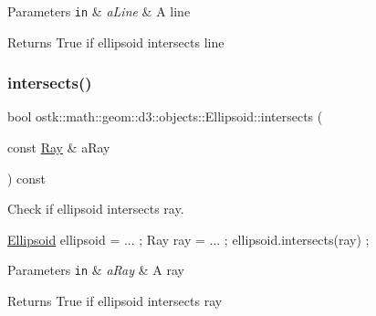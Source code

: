 \begin{DoxyParams}[1]{Parameters}
\mbox{\tt in}  & {\em a\+Line} & A line \\
\hline
\end{DoxyParams}
\begin{DoxyReturn}{Returns}
True if ellipsoid intersects line 
\end{DoxyReturn}
\mbox{\label{classostk_1_1math_1_1geom_1_1d3_1_1objects_1_1_ellipsoid_aa12b5c24a22e121b18c3022ce0534a29}} 
\subsubsection{\texorpdfstring{intersects()}{intersects()}\hspace{0.1cm}{\footnotesize\ttfamily [4/10]}}
{\footnotesize\ttfamily bool ostk\+::math\+::geom\+::d3\+::objects\+::\+Ellipsoid\+::intersects (\begin{DoxyParamCaption}\item[{const \hyperlink{classostk_1_1math_1_1geom_1_1d3_1_1objects_1_1_ray}{Ray} \&}]{a\+Ray }\end{DoxyParamCaption}) const}



Check if ellipsoid intersects ray. 


\begin{DoxyCode}
\hyperlink{classostk_1_1math_1_1geom_1_1d3_1_1objects_1_1_ellipsoid_acd84276f65a14db12623402a411712b7}{Ellipsoid} ellipsoid = ... ;
Ray ray = ... ;
ellipsoid.intersects(ray) ;
\end{DoxyCode}



\begin{DoxyParams}[1]{Parameters}
\mbox{\tt in}  & {\em a\+Ray} & A ray \\
\hline
\end{DoxyParams}
\begin{DoxyReturn}{Returns}
True if ellipsoid intersects ray 
\end{DoxyReturn}
\mbox{\label{classostk_1_1math_1_1geom_1_1d3_1_1objects_1_1_ellipsoid_ac7fc0339626b86b044d3c1a8fc174211}} 
